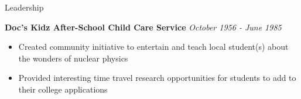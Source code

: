\documentclass{./resume}
\begin{document}
\begin{rSection}{Leadership}
 
  {\bf Doc's Kidz After-School Child Care Service} {\em \hfill October 1956 - June 1985}
  \vspace{-6pt}
  \begin{itemize}[nosep]
    \item Created community initiative to entertain and teach local student(s) about the wonders of nuclear physics
    \item Provided interesting time travel research opportunities for students to add to their college applications
  \end{itemize}

\end{rSection}

\vspace{1.2em}
\begin{center}
\end{center}
\end{document}
